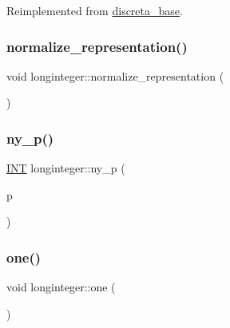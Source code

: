 Reimplemented from \mbox{\hyperlink{classdiscreta__base_a65ad2034f2f4518d424b814974018a03}{discreta\+\_\+base}}.

\mbox{\label{classlonginteger_a5e03d4e260c963943ba123114314c88b}} 
\subsubsection{\texorpdfstring{normalize\+\_\+representation()}{normalize\_representation()}}
{\footnotesize\ttfamily void longinteger\+::normalize\+\_\+representation (\begin{DoxyParamCaption}{ }\end{DoxyParamCaption})}

\mbox{\label{classlonginteger_a2e791f6e15c1ef6f7cd2dd3bf0a6d4c1}} 
\subsubsection{\texorpdfstring{ny\+\_\+p()}{ny\_p()}}
{\footnotesize\ttfamily \mbox{\hyperlink{galois_8h_a09fddde158a3a20bd2dcadb609de11dc}{I\+NT}} longinteger\+::ny\+\_\+p (\begin{DoxyParamCaption}\item[{\mbox{\hyperlink{galois_8h_a09fddde158a3a20bd2dcadb609de11dc}{I\+NT}}}]{p }\end{DoxyParamCaption})}

\mbox{\label{classlonginteger_ae1b9507b0d658768ceb278659e2adf1a}} 
\subsubsection{\texorpdfstring{one()}{one()}}
{\footnotesize\ttfamily void longinteger\+::one (\begin{DoxyParamCaption}{ }\end{DoxyParamCaption})\hspace{0.3cm}{\ttfamily [virtual]}}




